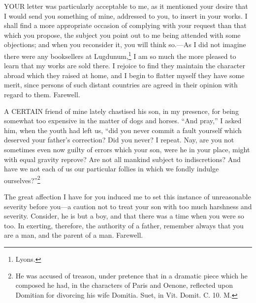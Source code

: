 
YOUR letter was particularly acceptable to me, as it mentioned your desire
that I would send you something of mine, addressed to you, to insert in
your works. I shall find a more appropriate occasion of complying with
your request than that which you propose, the subject you point out to me
being attended with some objections; and when you reconsider it, you will
think so.—As I did not imagine there were any booksellers at
Lugdunum,\footnote{Lyons.} I am so much the more pleased to learn that
my works are sold there. I rejoice to find they maintain the character
abroad which they raised at home, and I begin to flatter myself they have
some merit, since persons of such distant countries are agreed in their
opinion with regard to them. Farewell.


A CERTAIN friend of mine lately chastised his son, in my presence, for
being somewhat too expensive in the matter of dogs and horses. ``And pray,''
I asked him, when the youth had left us, ``did you never commit a fault
yourself which deserved your father's correction? Did you never? I repeat.
Nay, are you not sometimes even now guilty of errors which your son, were
he in your place, might with equal gravity reprove? Are not all mankind
subject to indiscretions? And have we not each of us our particular
follies in which we fondly indulge ourselves?''\footnote{He was accused of
treason, under pretence that in a dramatic piece which he composed he had,
in the characters of Paris and Oenone, reflected upon Domitian for
divorcing his wife Domitia. Suet, in Vit. Domit. C. 10. M.}

The great affection I have for you induced me to set this instance of
unreasonable severity before you—a caution not to treat your son
with too much harshness and severity. Consider, he is but a boy, and that
there was a time when you were so too. In exerting, therefore, the
authority of a father, remember always that you are a man, and the parent
of a man. Farewell.


